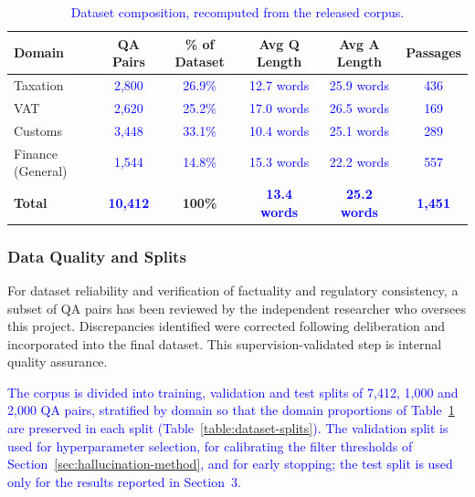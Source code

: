 \documentclass{article}
\newcommand{\revised}[1]{\textcolor{blue}{#1}}
\newcommand{\revised}[1]{#1}
\begin{document}
\begin{table}[!h]
\centering
\caption{\revised{Dataset composition, recomputed from the released corpus.}}
\label{table:dataset-composition}
\begin{tabular}{lccccc}
\hline
\textbf{Domain} & \textbf{QA Pairs} & \textbf{\% of Dataset} & \textbf{Avg Q Length} & \textbf{Avg A Length} & \textbf{Passages} \\
\hline
Taxation & \revised{2,800} & \revised{26.9\%} & \revised{12.7 words} & \revised{25.9 words} & \revised{436} \\
VAT & \revised{2,620} & \revised{25.2\%} & \revised{17.0 words} & \revised{26.5 words} & \revised{169} \\
Customs & \revised{3,448} & \revised{33.1\%} & \revised{10.4 words} & \revised{25.1 words} & \revised{289} \\
Finance (General) & \revised{1,544} & \revised{14.8\%} & \revised{15.3 words} & \revised{22.2 words} & \revised{557} \\
\hline
\textbf{Total} & \textbf{\revised{10,412}} & \textbf{100\%} & \textbf{\revised{13.4 words}} & \textbf{\revised{25.2 words}} & \textbf{\revised{1,451}} \\
\hline
\end{tabular}
\end{table}

\subsubsection{Data Quality and Splits}
\label{sec:splits}

For dataset reliability and verification of factuality and regulatory consistency, a
subset of QA pairs has been reviewed by the independent researcher who oversees this
project. Discrepancies identified were corrected following deliberation and
incorporated into the final dataset. This supervision-validated step is internal
quality assurance.

\revised{The corpus is divided into training, validation and test splits of 7,412,
1,000 and 2,000 QA pairs, stratified by domain so that the domain proportions of
Table~\ref{table:dataset-composition} are preserved in each split
(Table~\ref{table:dataset-splits}). The validation split is used for hyperparameter
selection, for calibrating the filter thresholds of
Section~\ref{sec:hallucination-method}, and for early stopping; the test split is used
only for the results reported in Section~3.}
\end{document}
